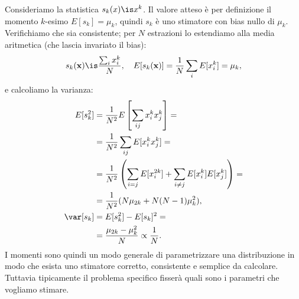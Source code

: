 
Consideriamo la statistica $s_k(x)\is x^k$.
Il valore atteso è per definizione il momento $k$-esimo
%
$E[s_k]=\mu_k$,
quindi $s_k$ è uno stimatore con bias nullo di $\mu_k$.
Verifichiamo che sia consistente;
per $N$ estrazioni lo estendiamo alla media aritmetica (che lascia invariato il bias):
\begin{align*}
	s_k(\mathbf x)
	\is \frac{\sum_i x_i^k}N, \quad
	E[s_k(\mathbf x)]
	= \frac1N \sum_i E[x_i^k]
	= \mu_k,
\end{align*}
e calcoliamo la varianza:
\begin{align*}
	E[s_k^2]
	&= \frac1{N^2} E \left[ \sum_{ij} x_i^k x_j^k \right] = \\
	&= \frac1{N^2} \sum_{ij} E[x_i^k x_j^k] = \\
	&= \frac1{N^2} \left( \sum_{i=j} E[x_i^{2k}] + \sum_{i\neq j} E[x_i^k] E[x_j^k] \right) = \\
	&= \frac1{N^2} (N\mu_{2k} + N(N-1)\mu_k^2), \\
	\var[s_k]
	&= E[s_k^2] - E[s_k]^2 = \\
	&= \frac{\mu_{2k} - \mu_k^2}N
	\propto \frac1N.
\end{align*}
I momenti sono quindi un modo generale di parametrizzare una distribuzione in modo che esista uno stimatore corretto, consistente e semplice da calcolare.
Tuttavia tipicamente il problema specifico fisserà quali sono i parametri che vogliamo stimare.

